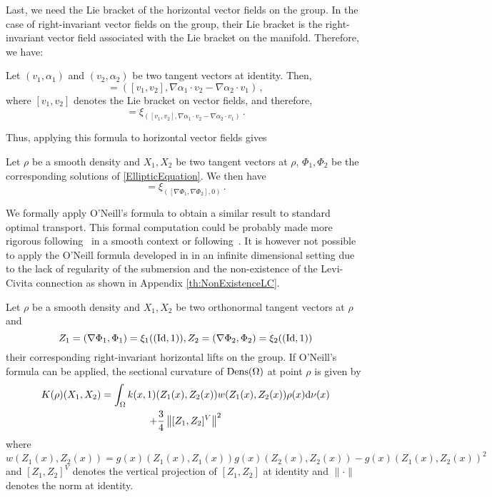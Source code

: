 Last, we need the Lie bracket of the horizontal vector fields on the group. In the case of right-invariant vector fields on the group, their Lie bracket is the right-invariant vector field associated with the Lie bracket on the manifold. Therefore, we have:
\begin{proposition}
Let $(v_1,\alpha_1)$ and $(v_2,\alpha_2)$ be two tangent vectors at
identity. Then,
 \begin{equation}
[(v_1,\alpha_1),(v_2,\alpha_2)] = \left( [v_1,v_2] , \nabla
\alpha_1\cdot v_2 - \nabla \alpha_2\cdot v_1 \right)\,,
\end{equation}
where $ [v_1,v_2]$ denotes the Lie bracket on vector fields, and therefore,
 \begin{equation}
[\xi_{(v_1,\alpha_1)},\xi_{(v_2,\alpha_2)}] = \xi_{\left( [v_1,v_2] ,
\nabla \alpha_1\cdot v_2 - \nabla \alpha_2\cdot v_1 \right)}\,.
\end{equation}

 \end{proposition}
Thus, applying this formula to horizontal vector fields gives
\begin{corollary}
Let $\rho$ be a smooth density and $X_1, X_2$ be two tangent vectors at
$\rho$, $\Phi_1,\Phi_2$ be the corresponding solutions of
\eqref{EllipticEquation}. We then have
 \begin{equation}
[\xi_{(\nabla \Phi_1,\Phi_1)},\xi_{(\nabla \Phi_2,\Phi_2)}] =
\xi_{\left( [\nabla \Phi_1,\nabla \Phi_2] ,0 \right)}\,.
\end{equation}
\end{corollary}

We formally apply O'Neill's formula to obtain a similar result to
standard optimal transport. This formal computation could be probably
made more rigorous following~\cite{lott2008some} in a smooth context or
following~\cite{UserGuideOT}. It is however not possible to apply the O'Neill formula developed in \cite{SobolevMetricsCurvature} in an infinite dimensional setting due to the lack of regularity of the submersion and the non-existence of the Levi-Civita connection as shown in Appendix \ref{th:NonExistenceLC}.	

\begin{proposition}\label{prop-curvature}
Let $\rho$ be a smooth density and $X_1, X_2$ be two orthonormal tangent
vectors at $\rho$ and $$Z_1= (\nabla \Phi_1,\Phi_1)=\xi_{1}((\operatorname{Id},1)), Z_2=
(\nabla \Phi_2,\Phi_2)=\xi_{2}((\operatorname{Id},1))$$ their corresponding
right-invariant horizontal lifts on the group.
If O'Neill's formula can be applied, the sectional curvature of
$\operatorname{Dens}(\Omega)$ at point $\rho$ is given by
\begin{multline}\label{SectionalCurvatureONeill}
K(\rho)(X_1,X_2) = \int_\Omega k(x,1)(Z_1(x),Z_2(x)) w(Z_1(x),Z_2(x))
\rho(x) \mathrm{d} \nu(x) \\ + \frac 34 \left\| [Z_1,Z_2]^V \right\|^2
\end{multline}
where
$$w(Z_1(x),Z_2(x)) =
g(x)(Z_1(x),Z_1(x))g(x)(Z_2(x),Z_2(x))-g(x)(Z_1(x),Z_2(x))^2$$ and $
[Z_1,Z_2]^V$ denotes the vertical projection of $[Z_1,Z_2]$ at identity
and $\| \cdot \|$ denotes the norm at identity.
\end{proposition}

